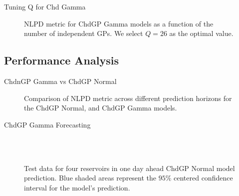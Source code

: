 \begin{frame}{Tuning Q for Chd Gamma}
	\begin{figure}[htbp]
		\centering
		\setlength\figurewidth{\columnwidth} 
		\setlength{}
		
		\caption{NLPD metric for ChdGP Gamma models as a function of the number of independent GPs. We select $Q = 26$ as the optimal value.}
	\end{figure}
\end{frame}

\subsection{Performance Analysis}

\begin{frame}{ChdnGP Gamma vs ChdGP Normal}
	\begin{figure}[htbp]
		\centering
		\setlength\figurewidth{\columnwidth} 
		\setlength{}
		
		\caption{Comparison of NLPD metric across different prediction horizons for the ChdGP Normal, and ChdGP Gamma models.}
	\end{figure}
	
\end{frame}

\begin{frame}{ChdGP Gamma Forecasting}
	\centering
	\begin{figure}[htbp]
		\tiny
		\setlength{} 
		\setlength{}
		
		\subfloat[$T.$]{}\hfill
		\subfloat[$A.$]{}\\[-0.5cm]
		\subfloat[$I.$]{}\hfill
		\subfloat[$O.$]{}\\[-0.4cm]
		
		\caption{Test data for four reservoirs in one day ahead ChdGP Normal model prediction. Blue shaded areas represent the $95\%$ centered confidence interval for the model's prediction.}
	\end{figure}
\end{frame}

